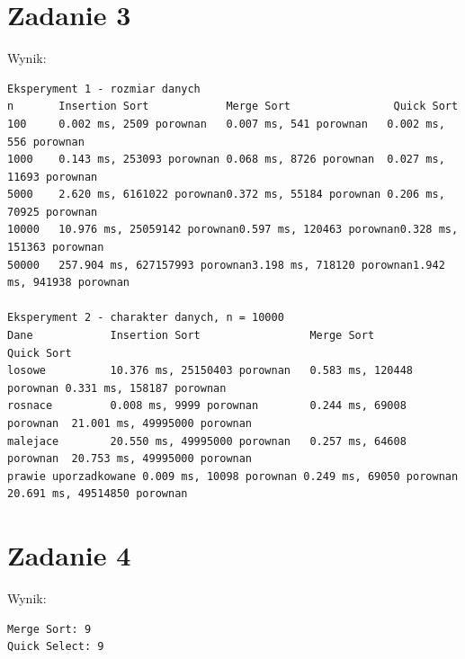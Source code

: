 \documentclass[10pt,a4paper]{article}
\begin{document}
\section*{Zadanie 3}
\noindent Wynik:
\begin{verbatim}
Eksperyment 1 - rozmiar danych
n       Insertion Sort            Merge Sort                Quick Sort
100     0.002 ms, 2509 porownan   0.007 ms, 541 porownan   0.002 ms, 556 porownan
1000    0.143 ms, 253093 porownan 0.068 ms, 8726 porownan  0.027 ms, 11693 porownan
5000    2.620 ms, 6161022 porownan0.372 ms, 55184 porownan 0.206 ms, 70925 porownan
10000   10.976 ms, 25059142 porownan0.597 ms, 120463 porownan0.328 ms, 151363 porownan
50000   257.904 ms, 627157993 porownan3.198 ms, 718120 porownan1.942 ms, 941938 porownan

Eksperyment 2 - charakter danych, n = 10000
Dane            Insertion Sort                 Merge Sort                Quick Sort
losowe          10.376 ms, 25150403 porownan   0.583 ms, 120448 porownan 0.331 ms, 158187 porownan
rosnace         0.008 ms, 9999 porownan        0.244 ms, 69008 porownan  21.001 ms, 49995000 porownan
malejace        20.550 ms, 49995000 porownan   0.257 ms, 64608 porownan  20.753 ms, 49995000 porownan
prawie uporzadkowane 0.009 ms, 10098 porownan 0.249 ms, 69050 porownan  20.691 ms, 49514850 porownan
\end{verbatim}

\section*{Zadanie 4}
\noindent Wynik:
\begin{verbatim}
Merge Sort: 9
Quick Select: 9
\end{verbatim}
\end{document}
